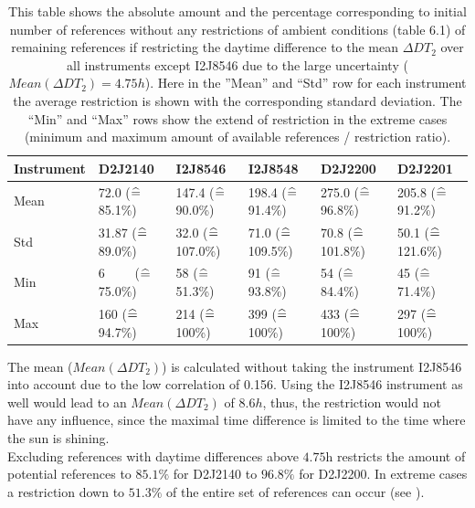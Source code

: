\begin{table}
	\centering
	\begin{tabular}{p{1.8cm}|p{2.15cm}|p{2.15cm}|p{2.15cm}|p{2.15cm}|p{2.15cm}}
		Instrument	&D2J2140&I2J8546& I2J8548&D2J2200&D2J2201\\
		\toprule
		Mean&
		72.0 ($\mathrel{\widehat{=}}\,$85.1\%) &		147.4 ($\mathrel{\widehat{=}}\,$90.0\%)&
		198.4 ($\mathrel{\widehat{=}}\,$91.4\%)&		275.0 ($\mathrel{\widehat{=}}\,$96.8\%)&
		205.8 ($\mathrel{\widehat{=}}\,$91.2\%)\\
		\midrule
		Std&		31.87 ($\mathrel{\widehat{=}}\,$89.0\%)&32.0 ($\mathrel{\widehat{=}}\,$107.0\%)&
		71.0 ($\mathrel{\widehat{=}}\,$109.5\%)&		70.8 ($\mathrel{\widehat{=}}\,$101.8\%)&
		50.1 ($\mathrel{\widehat{=}}\,$121.6\%) \\
		\midrule
		Min&
		6 $\qquad$($\mathrel{\widehat{=}}\,$75.0\%)&		58 ($\mathrel{\widehat{=}}\,$51.3\%)
		&91 ($\mathrel{\widehat{=}}\,$93.8\%)		&54 ($\mathrel{\widehat{=}}\,$84.4\%)
		&45 ($\mathrel{\widehat{=}}\,$71.4\%)\\
		\midrule
		Max&
		160 ($\mathrel{\widehat{=}}\,$94.7\%) &
		214 ($\mathrel{\widehat{=}}\,$100\%) &
		399 ($\mathrel{\widehat{=}}\,$100\%) &
		433 ($\mathrel{\widehat{=}}\,$100\%) &
		297 ($\mathrel{\widehat{=}}\,$100\%) \\
		\bottomrule
	\end{tabular}
	\caption{This table shows the absolute amount and the percentage corresponding to initial number of references without any restrictions of ambient conditions (table 6.1) of remaining references if restricting the daytime difference to the mean $\Delta DT_{2}$ over all instruments except I2J8546 due to the large uncertainty ($Mean(\Delta DT_{2}) = 4.75h$). Here in the ”Mean” and “Std” row for each  instrument the average restriction is shown with the corresponding standard deviation. The “Min” and “Max” rows show the extend of restriction in the extreme cases (minimum and maximum amount of available references / restriction ratio).}
	\label{tab:daytimerest}
\end{table}	
The mean ($Mean(\Delta DT_{2})$) is calculated without taking the instrument I2J8546 into account due to the low correlation of 0.156. Using the I2J8546 instrument as well would lead to an  $Mean(\Delta DT_{2})$ of $8.6h$, thus, the restriction would not have any influence, since the maximal time difference is limited to the time where the sun is shining.\\ 
Excluding references with daytime differences above $4.75$h restricts the amount of potential references to $85.1\%$ for D2J2140 to $96.8\%$ for D2J2200. In extreme cases a restriction down to $51.3\%$ of the entire set of references can occur (see ).




